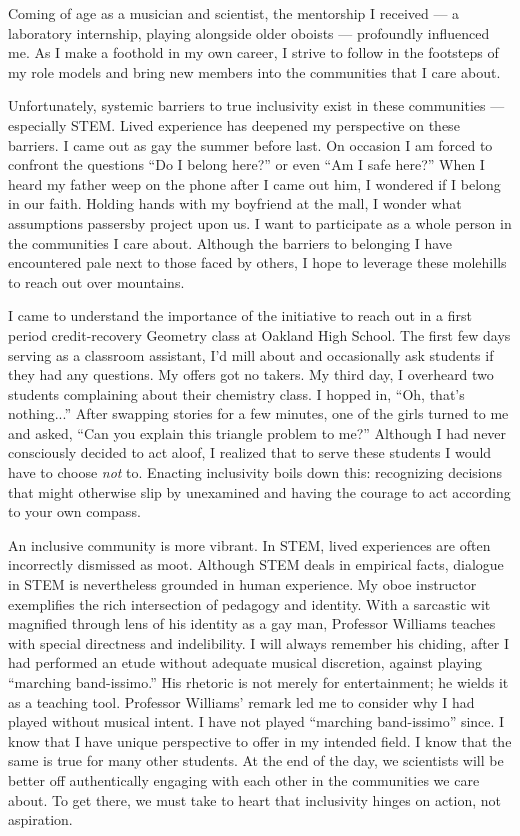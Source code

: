 Coming of age as a musician and scientist, the mentorship I received --- a laboratory internship, playing alongside older oboists --- profoundly influenced me.
As I make a foothold in my own career, I strive to follow in the footsteps of my role models and bring new members into the communities that I care about.

Unfortunately, systemic barriers to true inclusivity exist in these communities --- especially STEM.
Lived experience has deepened my perspective on these barriers.
I came out as gay the summer before last.
On occasion I am forced to confront the questions ``Do I belong here?'' or even ``Am I safe here?''
When I heard my father weep on the phone after I came out him, I wondered if I belong in our faith.
Holding hands with my boyfriend at the mall, I wonder what assumptions passersby project upon us.
I want to participate as a whole person in the communities I care about.
Although the barriers to belonging I have encountered pale next to those faced by others, I hope to leverage these molehills to reach out over mountains.

I came to understand the importance of the initiative to reach out in a first period credit-recovery Geometry class at Oakland High School.
The first few days serving as a classroom assistant, I'd mill about and occasionally ask students if they had any questions.
My offers got no takers.
My third day, I overheard two students complaining about their chemistry class.
I hopped in, ``Oh, that's nothing...''
After swapping stories for a few minutes, one of the girls turned to me and asked, ``Can you explain this triangle problem to me?''
Although I had never consciously decided to act aloof, I realized that to serve these students I would have to choose \textit{not} to.
Enacting inclusivity boils down this: recognizing decisions that might otherwise slip by unexamined and having the courage to act according to your own compass.

An inclusive community is more vibrant.
In STEM, lived experiences are often incorrectly dismissed as moot.
Although STEM deals in empirical facts, dialogue in STEM is nevertheless grounded in human experience.
My oboe instructor exemplifies the rich intersection of pedagogy and identity.
With a sarcastic wit magnified through lens of his identity as a gay man, Professor Williams teaches with special directness and indelibility.
I will always remember his chiding, after I had performed an etude without adequate musical discretion, against playing ``marching band-issimo.''
His rhetoric is not merely for entertainment; he wields it as a teaching tool.
Professor Williams' remark led me to consider why I had played without musical intent.
I have not played ``marching band-issimo'' since.
I know that I have unique perspective to offer in my intended field.
I know that the same is true for many other students.
At the end of the day, we scientists will be better off authentically engaging with each other in the communities we care about.
To get there, we must take to heart that inclusivity hinges on action, not aspiration.
